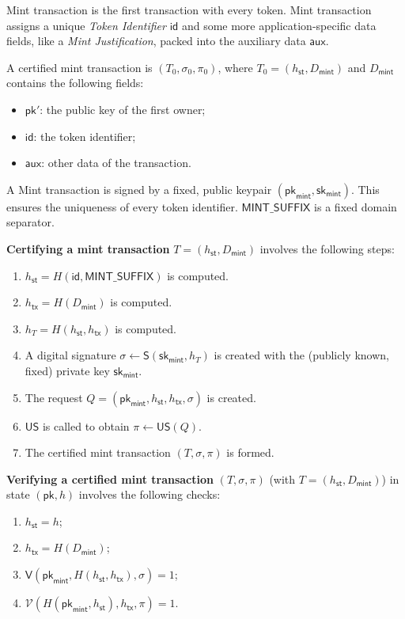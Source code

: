 \documentclass{article}
\newcommand{\sig}[0]{\mathsf{S}}
\newcommand{\sigver}[0]{\mathsf{V}}
\newcommand{\pubkey}[0]{\mathsf{pk}}
\newcommand{\prikey}[0]{\mathsf{sk}}
\newcommand{\unisrv}[0]{\mathsf{US}}
\newcommand{\sthash}[0]{h_\mathsf{st}}
\newcommand{\txhash}[0]{h_\mathsf{tx}}
\newcommand{\auxd}[0]{\mathsf{aux}}
\newcommand{\univer}[0]{\mathcal{V}}
\begin{document}
Mint transaction is the first transaction with every token. Mint transaction assigns a unique \emph{Token Identifier} $\mathsf{id}$ and some more application-specific data fields, like a \emph{Mint Justification}, packed into the auxiliary data $\auxd$.

A certified mint transaction is $(T_0, \sigma_0, \pi_0)$, where $T_0 = (\sthash, D_\mathsf{mint})$ and $D_\mathsf{mint}$ contains the following fields:
\begin{itemize}
    \item $\pubkey'$: the public key of the first owner;
    \item $\mathsf{id}$: the token identifier;
    \item $\auxd$: other data of the transaction.
\end{itemize}

\noindent A Mint transaction is signed by a fixed, public keypair $(\pubkey_\mathsf{mint}, \prikey_\mathsf{mint})$. This ensures the uniqueness of every token identifier. $\mathsf{MINT\_SUFFIX}$ is a fixed domain separator.\medskip

\noindent\textbf{Certifying a mint transaction} $T = (\sthash, D_\mathsf{mint})$ involves the following steps:
\begin{enumerate}
    \item $\sthash = H(\mathsf{id}, \mathsf{MINT\_SUFFIX})$ is computed.
	\item $\txhash = H(D_\mathsf{mint})$ is computed.
	\item $h_T = H(\sthash, \txhash)$ is computed.
	\item A digital signature $\sigma \gets \sig(\prikey_\mathsf{mint}, h_T)$ is created with the (publicly known, fixed) private key $\prikey_\mathsf{mint}$.
	\item The request $Q = (\pubkey_\mathsf{mint},\sthash,\txhash,\sigma)$ is created.
	\item $\unisrv$ is called to obtain $\pi\gets \unisrv(Q)$.
	\item The certified mint transaction $(T,\sigma,\pi)$ is formed.
\end{enumerate}

\noindent\textbf{Verifying a certified mint transaction} $(T,\sigma,\pi)$ (with $T=(\sthash, D_\mathsf{mint})$) in state $(\pubkey,h)$ involves the following checks:
\begin{enumerate}
	\item $\sthash=h$;
	\item $\txhash = H(D_\mathsf{mint})$;
	\item $\sigver(\pubkey_\mathsf{mint}, H(\sthash,\txhash),\sigma)=1$;
	\item $\univer(H(\pubkey_\mathsf{mint},\sthash),\txhash,\pi)=1$.
\end{enumerate}
\end{document}
